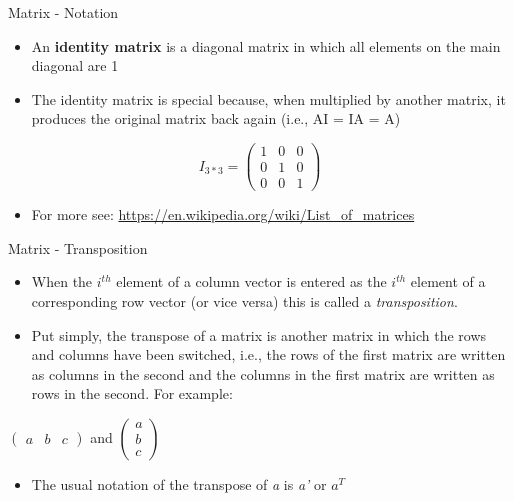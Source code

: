 \documentclass[
  ignorenonframetext,
]{beamer}
\providecommand{\tightlist}{%
  \setlength{\itemsep}{0pt}\setlength{\parskip}{0pt}}
\begin{document}
\begin{frame}{Matrix - Notation}
\protect\hypertarget{matrix---notation-5}{}

\begin{itemize}
\item
  An \textbf{identity matrix} is a diagonal matrix in which all elements
  on the main diagonal are 1
\item
  The identity matrix is special because, when multiplied by another
  matrix, it produces the original matrix back again (i.e., AI = IA = A)
\end{itemize}

\[I_{3*3} =
  \begin{pmatrix}
  1 & 0 & 0 \\
  0 & 1 & 0 \\
  0 & 0 & 1 
 \end{pmatrix}\]

\begin{itemize}
\tightlist
\item
  For more see: \url{https://en.wikipedia.org/wiki/List_of_matrices}
\end{itemize}

\end{frame}

\begin{frame}{Matrix - Transposition}
\protect\hypertarget{matrix---transposition}{}

\begin{itemize}
\item
  When the \(i^{th}\) element of a column vector is entered as the
  \(i^{th}\) element of a corresponding row vector (or vice versa) this
  is called a \emph{transposition}.
\item
  Put simply, the transpose of a matrix is another matrix in which the
  rows and columns have been switched, i.e., the rows of the first
  matrix are written as columns in the second and the columns in the
  first matrix are written as rows in the second. For example:
\end{itemize}

\(\begin{pmatrix} a & b & c \end{pmatrix}\) and
\(\begin{pmatrix} a \\ b \\ c \end{pmatrix}\)

\begin{itemize}
\tightlist
\item
  The usual notation of the transpose of \emph{a} is \emph{a'} or
  \emph{\(a^{T}\)}
\end{itemize}

\end{frame}
\end{document}
